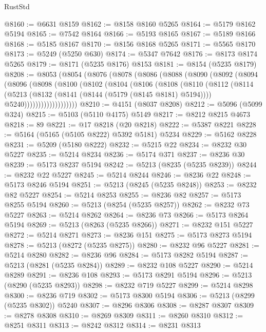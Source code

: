\begin{lexlean}{RustStd}
\begin{coremodule}
@8160 := @6631 @8159
@8162 := @8158 @8160 @5265
@8164 := @5179 @8162 @5194
@8165 := @7542 @8164
@8166 := @5193 @8165
@8167 := @5189 @8166
@8168 := @5185 @8167
@8170 := @8156 @8168 @5265
@8171 := @5565 @8170
@8173 := @5249 (@5250 @630)
@8174 := @5347 @7642
@8176 := @8173 @8174 @5265
@8179 := @8171 (@5235 @8176) @8153
@8181 := @8154 (@5235 @8179)
@8208 := @8053
    (@8054
      (@8076
        (@8078
          (@8086
            (@8088
              (@8090
                (@8092
                  (@8094
                    (@8096
                      (@8098
                        (@8100
                          (@8102
                            (@8104
                              (@8106
                                (@8108
                                  (@8110
                                    (@8112
                                      (@8114
                                        (@5213
                                          (@8132 (@8141 (@8144 (@5179 (@8145 @8181) @5194))))
                                          @5240)))))))))))))))))))
@8210 := @4151 (@8037 @8208)
@8212 := @5096 (@5099 @324)
@8215 := @5103 (@5110 @4175) @5149
@8217 := @8212 @8215 @4673
@8218 := 89
@8221 := @17 @8218 (@20 @8218)
@8222 := @5387 @8221
@8228 := @5164 (@5165 (@5105 @8222) @5392 @5181) @5234
@8229 := @5162 @8228
@8231 := @5209 (@5180 @8222)
@8232 := @5215 @22
@8234 := @8232 @30 @5227
@8235 := @5214 @8234
@8236 := @5174 @371
@8237 := @8236 @30
@8239 := @5173 @8237 @5194
@8242 := @5213 (@8235 (@5235 @8239))
@8244 := @8232 @22 @5227
@8245 := @5214 @8244
@8246 := @8236 @22
@8248 := @5173 @8246 @5194
@8251 := @5213 (@8245 (@5235 @8248))
@8253 := @8232 @82 @5227
@8254 := @5214 @8253
@8255 := @8236 @82
@8257 := @5173 @8255 @5194
@8260 := @5213 (@8254 (@5235 @8257))
@8262 := @8232 @73 @5227
@8263 := @5214 @8262
@8264 := @8236 @73
@8266 := @5173 @8264 @5194
@8269 := @5213 (@8263 (@5235 @8266))
@8271 := @8232 @151 @5227
@8272 := @5214 @8271
@8273 := @8236 @151
@8275 := @5173 @8273 @5194
@8278 := @5213 (@8272 (@5235 @8275))
@8280 := @8232 @96 @5227
@8281 := @5214 @8280
@8282 := @8236 @96
@8284 := @5173 @8282 @5194
@8287 := @5213 (@8281 (@5235 @8284))
@8289 := @8232 @108 @5227
@8290 := @5214 @8289
@8291 := @8236 @108
@8293 := @5173 @8291 @5194
@8296 := @5213 (@8290 (@5235 @8293))
@8298 := @8232 @719 @5227
@8299 := @5214 @8298
@8300 := @8236 @719
@8302 := @5173 @8300 @5194
@8306 := @5213 (@8299 (@5235 @8302)) @5240
@8307 := @8296 @8306
@8308 := @8287 @8307
@8309 := @8278 @8308
@8310 := @8269 @8309
@8311 := @8260 @8310
@8312 := @8251 @8311
@8313 := @8242 @8312
@8314 := @8231 @8313

\end{coremodule}
\end{lexlean}

